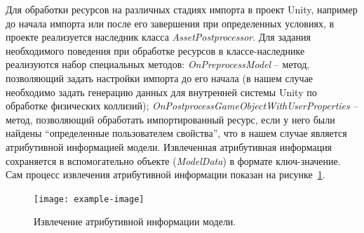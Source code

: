 Для обработки ресурсов на различных стадиях импорта в проект Unity,
например до начала импорта или после его завершения при определенных условиях,
в проекте реализуется наследник класса \emph{AssetPostprocessor}.
Для задания необходимого поведения при обработке ресурсов
в классе-наследнике реализуются набор специальных методов:
\emph{OnPreprocessModel} -- метод, позволяющий задать настройки импорта до его начала
(в нашем случае необходимо задать генерацию данных для внутренней
системы Unity по обработке физических коллизий);
\emph{OnPostprocessGameObjectWithUserProperties} -- метод, позволяющий
обработать импортированный ресурс, если у него были найдены
``определенные пользователем свойства'', что в нашем случае
является атрибутивной информацией модели.
Извлеченная атрибутивная информация сохраняется в вспомогательно объекте
(\emph{ModelData}) в формате ключ-значение.
Сам процесс извлечения атрибутивной информации показан
на рисунке~\ref{figure:SPostprocessor}.

\begin{figure}[ht]
    \centering
    \texttt{[image: example-image]}
    \caption{Извлечение атрибутивной информации модели.}
    \label{figure:SPostprocessor}
\end{figure}


